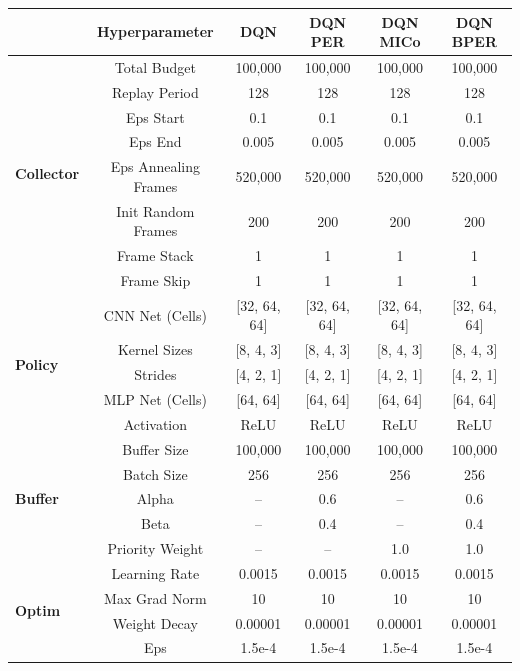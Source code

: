 \begin{table}[H]
\centering

\hspace*{-1cm}
\begin{tabular}{@{} lccccc @{}}
\toprule
& \textbf{Hyperparameter} & {\footnotesize\textbf{DQN}} & {\footnotesize \textbf{DQN PER}} & {\footnotesize\textbf{DQN MICo}} & {\footnotesize\textbf{DQN BPER}} \\ 
\midrule

\multirow{8}{*}{\textbf{Collector}} 
& Total Budget & 100,000 & 100,000 & 100,000 & 100,000 \\ 
& Replay Period & 128 & 128 & 128 & 128 \\ 
& Eps Start & 0.1 & 0.1 & 0.1 & 0.1 \\ 
& Eps End & 0.005 & 0.005 & 0.005 & 0.005 \\ 
& Eps Annealing Frames & 520,000 & 520,000 & 520,000 & 520,000 \\ 
& Init Random Frames & 200 & 200 & 200 & 200 \\ 
& Frame Stack & 1 & 1 & 1 & 1 \\
& Frame Skip & 1 & 1 & 1 & 1 \\ 
\midrule

\multirow{5}{*}{\textbf{Policy}} 
& CNN Net (Cells) & [32, 64, 64] & [32, 64, 64] & [32, 64, 64] & [32, 64, 64] \\ 
& Kernel Sizes & [8, 4, 3] & [8, 4, 3] & [8, 4, 3] & [8, 4, 3] \\ 
& Strides & [4, 2, 1] & [4, 2, 1] & [4, 2, 1] & [4, 2, 1] \\ 
& MLP Net (Cells) & [64, 64] & [64, 64] & [64, 64] & [64, 64] \\ 
& Activation & ReLU & ReLU & ReLU & ReLU \\ 
\midrule

\multirow{5}{*}{\textbf{Buffer}} 
& Buffer Size & 100,000 & 100,000 & 100,000 & 100,000 \\ 
& Batch Size & 256 & 256 & 256 & 256 \\ 
& Alpha & -- & 0.6 & -- & 0.6 \\ 
& Beta & -- & 0.4 & -- & 0.4 \\ 
& Priority Weight & -- & -- & 1.0 & 1.0 \\ 
\midrule

\multirow{4}{*}{\textbf{Optim}} 
& Learning Rate & 0.0015 & 0.0015 & 0.0015 & 0.0015 \\ 
& Max Grad Norm & 10 & 10 & 10 & 10 \\ 
& Weight Decay & 0.00001 & 0.00001 & 0.00001 & 0.00001 \\ 
& Eps & 1.5e-4 & 1.5e-4 & 1.5e-4 & 1.5e-4 \\ 
\midrule


\end{tabular}
\end{table}
